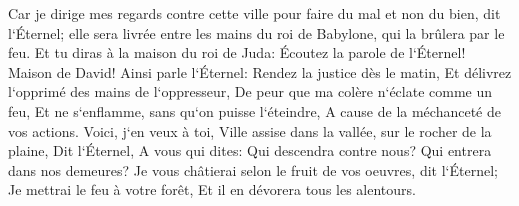 \verse Car je dirige mes regards contre cette ville pour faire du mal et non du bien, dit l`Éternel; elle sera livrée entre les mains du roi de Babylone, qui la brûlera par le feu. 
\verse Et tu diras à la maison du roi de Juda: Écoutez la parole de l`Éternel! 
\verse Maison de David! Ainsi parle l`Éternel: Rendez la justice dès le matin, Et délivrez l`opprimé des mains de l`oppresseur, De peur que ma colère n`éclate comme un feu, Et ne s`enflamme, sans qu`on puisse l`éteindre, A cause de la méchanceté de vos actions. 
\verse Voici, j`en veux à toi, Ville assise dans la vallée, sur le rocher de la plaine, Dit l`Éternel, A vous qui dites: Qui descendra contre nous? Qui entrera dans nos demeures? 
\verse Je vous châtierai selon le fruit de vos oeuvres, dit l`Éternel; Je mettrai le feu à votre forêt, Et il en dévorera tous les alentours. 

